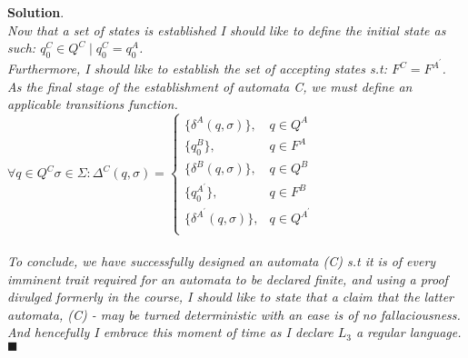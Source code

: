 \documentclass[12pt]{article}
\renewcommand{\=}[1]{\stackrel{#1}{=}} %
\theoremstyle{definition}
\newenvironment{s}{%
        \begin{trivlist} \item \textbf{Solution}. }{%
            \hspace*{\fill} $\blacksquare$\end{trivlist}}%
\begin{document}
\begin{s}
\\
\emph{Now that a set of states is established I should like to define the initial state as such: $q_0^{C} \in Q^{C} \mid q_0^{C} = q_0^{A}$.} \newline
\\
\emph{Furthermore, I should like to establish the set of accepting states s.t: $F^{C} = F^{A^{\prime}}$.} \newline
\\
  \emph{As the final stage of the establishment of automata C, we must define an applicable transitions function.} \newline
\\
  \(
    \forall q \in Q^{C} \sigma \in \Sigma: \Delta^{C}(q, \sigma) =
    \begin{cases}
      \{\delta^{A}(q, \sigma)\}, & q \in Q^{A} \\
      \{q_0^{B}\}, & q \in F^{A} \\
      \{\delta^{B}(q, \sigma)\}, & q \in Q^{B} \\
      \{q_0^{A^{\prime}}\}, & q \in F^{B} \\
      \{\delta^{A^{\prime}}(q, \sigma)\}, & q \in Q^{A^{\prime}} \\
    \end{cases}
  \)
\newline
\\
\\
\emph{To conclude, we have successfully designed an automata (C) s.t it is of every imminent trait required for an automata to be declared finite, and using a proof divulged formerly in the course, I should like to state that a claim that the latter automata, (C) - may be turned deterministic with an ease is of no fallaciousness. And hencefully I embrace this moment of time as I declare $L_3$ a regular language.}
\end{s}
\end{document}
